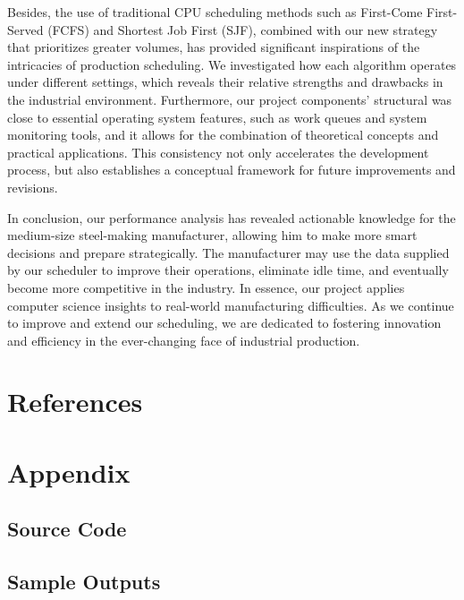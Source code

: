 \documentclass[conference]{IEEEtran}
\begin{document}
Besides, the use of traditional CPU scheduling methods such as First-Come First-Served (FCFS) and Shortest Job First (SJF), combined with our new strategy that prioritizes greater volumes, has provided significant inspirations of the intricacies of production scheduling. We investigated how each algorithm operates under different settings, which reveals their relative strengths and drawbacks in the industrial environment. Furthermore, our project components' structural was close to essential operating system features, such as work queues and system monitoring tools, and it allows for the combination of theoretical concepts and practical applications. This consistency not only accelerates the development process, but also establishes a conceptual framework for future improvements and revisions.

In conclusion, our performance analysis has revealed actionable knowledge for the medium-size steel-making manufacturer, allowing him to make more smart decisions and prepare strategically. The manufacturer may use the data supplied by our scheduler to improve their operations, eliminate idle time, and eventually become more competitive in the industry. In essence, our project applies computer science insights to real-world manufacturing difficulties. As we continue to improve and extend our scheduling, we are dedicated to fostering innovation and efficiency in the ever-changing face of industrial production. 

\section{\textbf{References}}



\section{\textbf{Appendix}}

\subsection{Source Code}


\subsection{Sample Outputs}
\end{document}
